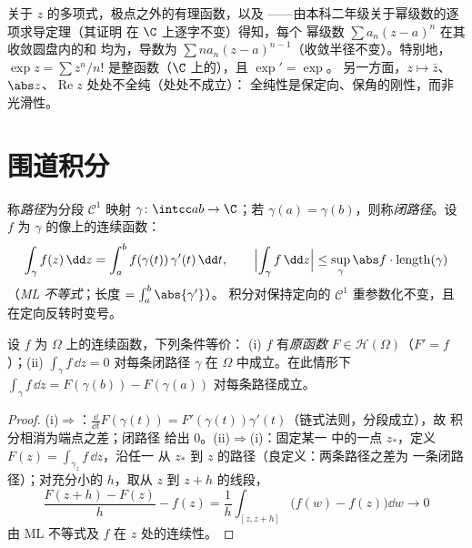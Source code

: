 \begin{example}\label{ex:b3:holomorphic:examples}
关于 $z$ 的多项式，极点之外的有理函数，以及
——由本科二年级关于幂级数的逐项求导定理（其证明
在 $\C$ 上逐字不变）得知，每个
幂级数 $\sum a_n(z - a)^n$ 在其收敛圆盘内的和
均为，导数为 $\sum na_n(z -
a)^{n-1}$（收敛半径不变）。特别地，$\exp z = \sum z^n/n!$
是整函数（$\C$ 上的），且 $\exp' = \exp$。
另一方面，$z \mapsto \bar z$、$\abs z$、$\operatorname{Re}z$
处处不全纯（处处不成立）：
全纯性是保定向、保角的刚性，而非
光滑性。
\end{example}

\section{围道积分}

\begin{definition}\label{def:b3:holomorphic:contour}
称\emph{路径}为分段 $\mathcal C^1$ 映射 $\gamma \colon
\intcc ab \to \C$；若 $\gamma(a) =
\gamma(b)$，则称\emph{闭路径}。设
$f$ 为 $\gamma$ 的像上的连续函数：
\[
\int_\gamma f(z)\,\dd z =
\int_a^b f(\gamma(t))\,\gamma'(t)\,\dd t,
\qquad
\Bigl|\int_\gamma f\,\dd z\Bigr| \leq
\sup_{\gamma}\abs f\cdot\operatorname{length}(\gamma)
\]
（\emph{ML 不等式}；长度 $= \int_a^b\abs{\gamma'}$）。
积分对保持定向的 $\mathcal C^1$
重参数化不变，且在定向反转时变号。
\end{definition}

\begin{proposition}[原函数]\label{prop:b3:holomorphic:primitive}
设 $f$ 为 $\Omega$ 上的连续函数，下列条件等价：
(i) $f$ 有\emph{原函数} $F \in \mathcal H(\Omega)$（$F'
= f$）；(ii) $\int_\gamma f\,\dd z = 0$ 对每条闭路径
$\gamma$ 在 $\Omega$ 中成立。在此情形下 $\int_\gamma f\,\dd z =
F(\gamma(b)) - F(\gamma(a))$ 对每条路径成立。
\end{proposition}

\begin{proof}
(i)$\Rightarrow$：$\frac{\dd}{\dd t}F(\gamma(t)) =
F'(\gamma(t))\gamma'(t)$（链式法则，分段成立），故
积分相消为端点之差；闭路径
给出 $0$。(ii)$\Rightarrow$(i)：固定某一
中的一点 $z_*$，定义 $F(z) = \int_{\gamma_z}f\,\dd z$，沿任一
从 $z_*$ 到 $z$ 的路径（良定义：两条路径之差为
一条闭路径）；对充分小的 $h$，取从 $z$ 到
$z + h$ 的线段，
\[
\frac{F(z + h) - F(z)}{h} - f(z)
= \frac1h\int_{[z, z+h]}\bigl(f(w) - f(z)\bigr)\dd w
\longrightarrow 0
\]
由 ML 不等式及 $f$ 在 $z$ 处的连续性。
\end{proof}

